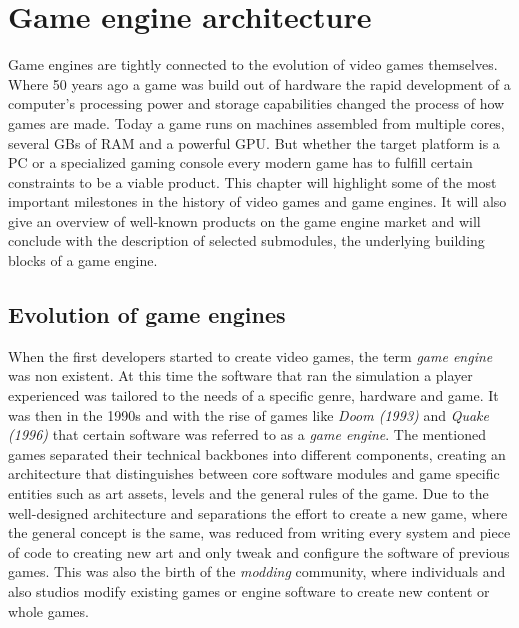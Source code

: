 \chapter{Game engine architecture}

Game engines are tightly connected to the evolution of video games themselves. Where 50 years ago a game was build out of hardware the rapid development of a computer's processing power and storage capabilities changed the process of how games are made. Today a game runs on machines assembled from multiple cores, several \acp{GB} of \ac{RAM} and a powerful \ac{GPU}. But whether the target platform is a PC or a specialized gaming console every modern game has to fulfill certain constraints to be a viable product. This chapter will highlight some of the most important milestones in the history of video games and game engines. It will also give an overview of well-known products on the game engine market and will conclude with the description of selected submodules, the underlying building blocks of a game engine.

\section{Evolution of game engines}

When the first developers started to create video games, the term \textit{game engine} was non existent. At this time the software that ran the simulation a player experienced was tailored to the needs of a specific genre, hardware and game. It was then in the 1990s and with the rise of games like \textit{Doom (1993)} and \textit{Quake (1996)} that certain software was referred to as a \textit{game engine}. The mentioned games separated their technical backbones into different components, creating an architecture that distinguishes between core software modules and game specific entities such as art assets, levels and the general rules of the game. Due to the well-designed architecture and separations the effort to create a new game, where the general concept is the same, was reduced from writing every system and piece of code to creating new art and only tweak and configure the software of previous games. This was also the birth of the \textit{modding} community, where individuals and also studios modify existing games or engine software to create new content or whole games.

